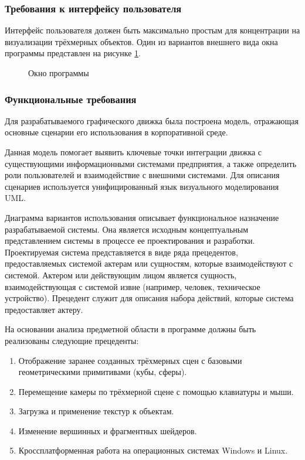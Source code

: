 \subsubsection{Требования к интерфейсу пользователя}

Интерфейс пользователя должен быть максимально простым для концентрации на визуализации трёхмерных объектов. Один из вариантов внешнего вида окна программы представлен на рисунке \ref{interface:image}.

\begin{figure}[ht]
\caption{Окно программы}
\label{interface:image}
\end{figure}

\subsubsection{Функциональные требования}

Для разрабатываемого графического движка была построена модель, отражающая основные сценарии его использования в корпоративной среде.

Данная модель помогает выявить ключевые точки интеграции движка с существующими информационными системами предприятия, а также определить роли пользователей и взаимодействие с внешними системами. Для описания сценариев используется унифицированный язык визуального моделирования UML.

Диаграмма вариантов использования описывает функциональное назначение разрабатываемой системы. Она является исходным концептуальным представлением системы в процессе ее проектирования и разработки. Проектируемая система представляется в виде ряда прецедентов, предоставляемых системой актерам или сущностям, которые взаимодействуют с системой. Актером или действующим лицом является сущность, взаимодействующая с системой извне (например, человек, техническое устройство). Прецедент служит для описания набора действий, которые система предоставляет актеру.

На основании анализа предметной области в программе должны быть реализованы следующие прецеденты:

\begin{enumerate}
    \item Отображение заранее созданных трёхмерных сцен с базовыми геометрическими примитивами (кубы, сферы).
    \item Перемещение камеры по трёхмерной сцене с помощью клавиатуры и мыши.
    \item Загрузка и применение текстур к объектам.
    \item Изменение вершинных и фрагментных шейдеров.
    \item Кроссплатформенная работа на операционных системах Windows и Linux.
\end{enumerate}

